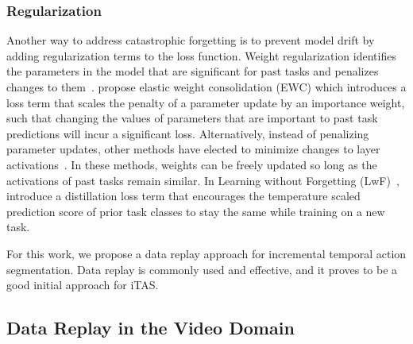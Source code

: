 \subsubsection{Regularization}

Another way to address catastrophic forgetting is to prevent model drift by adding regularization terms to the loss function. Weight regularization identifies the parameters in the model that are significant for past tasks and penalizes changes to them~\cite{kirkpatrick2017ewc,zenke2017continual,aljundi2018mas}. \citeauthor{kirkpatrick2017ewc} propose elastic weight consolidation (EWC) which introduces a loss term that scales the penalty of a parameter update by an importance weight, such that changing the values of parameters that are important to past task predictions will incur a significant loss. 
Alternatively, instead of penalizing parameter updates, other methods have elected to minimize changes to layer activations~\cite{li2016lwf,junting2020dmc,jung2018lfl}. In these methods, weights can be freely updated so long as the activations of past tasks remain similar. In Learning without Forgetting (LwF)~\cite{li2016lwf}, \citeauthor{li2016lwf} introduce a distillation loss term that encourages the temperature scaled prediction score of prior task classes to stay the same while training on a new task.


For this work, we propose a data replay approach for incremental temporal action segmentation. Data replay is commonly used and effective, and it proves to be a good initial approach for iTAS.

\subsection{Data Replay in the Video Domain}


